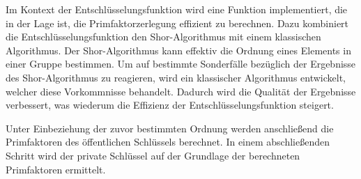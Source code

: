 Im Kontext der Entschlüsselungsfunktion wird eine Funktion implementiert,
die in der Lage ist, die Primfaktorzerlegung effizient zu berechnen.
Dazu kombiniert die Entschlüsselungsfunktion den Shor-Algorithmus mit einem klassischen Algorithmus.
Der Shor-Algorithmus kann effektiv die Ordnung eines Elements in einer Gruppe bestimmen. 
Um auf bestimmte Sonderfälle bezüglich der Ergebnisse des Shor-Algorithmus zu reagieren, 
wird ein klassischer Algorithmus entwickelt, welcher diese Vorkommnisse behandelt. 
Dadurch wird die Qualität der Ergebnisse verbessert, was wiederum die Effizienz der Entschlüsselungsfunktion steigert.


Unter Einbeziehung der zuvor bestimmten Ordnung werden anschließend die Primfaktoren des öffentlichen Schlüssels berechnet.
In einem abschließenden Schritt wird der private Schlüssel auf der Grundlage der berechneten Primfaktoren ermittelt.



